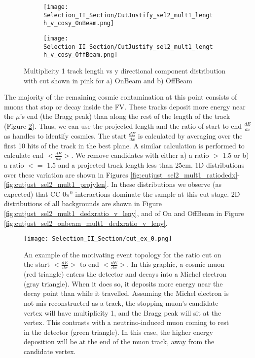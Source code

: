 \begin{figure}[h!]
\centering
  \begin{subfigure}[t]{0.25\textwidth}
    \centering
\texttt{[image: Selection\_II\_Section/CutJustify\_sel2\_mult1\_length\_v\_cosy\_OnBeam.png]}
    \caption{ }
  \end{subfigure} 
  \hspace{20mm}
  \begin{subfigure}[t]{0.25\textwidth}
    \centering
    \texttt{[image: Selection\_II\_Section/CutJustify\_sel2\_mult1\_length\_v\_cosy\_OffBeam.png]}
    \caption{ }
  \end{subfigure} 
\caption{Multiplicity 1 track length vs y directional component distribution with cut shown in pink for a) OnBeam and b) OffBeam }
\label{fig:cutjust_sel2_onbeam_mult1_len_v_cosy}
\end{figure}

\par The majority of the remaining cosmic contamination at this point consists of muons that stop or decay inside the FV.  These tracks deposit more energy near the $\mu$'s end (the Bragg peak) than along the rest of the length of the track (Figure \ref{fig:cut_ex_0}). Thus, we can use the projected length and the ratio of start to end $\frac{dE}{dx}$ as handles to identify cosmics. The start $\frac{dE}{dx}$ is calculated by averaging over the first 10 hits of the track in the best plane. A similar calculation is performed to calculate end $<\frac{dE}{dx}>$. We remove candidates with either a) a ratio $>$ 1.5 or b) a ratio $<=$ 1.5 and a projected track length less than 25cm.  1D distributions over these variation are shown in Figures \ref{fig:cutjust_sel2_mult1_ratiodedx}-\ref{fig:cutjust_sel2_mult1_projylen}.  In these distributions we observe (as expected) that CC-0$\pi^0$ interactions dominate the sample at this cut stage. 2D distributions of all backgrounds are shown in Figure \ref{fig:cutjust_sel2_mult1_dedxratio_v_leny}, and of On and OffBeam in Figure \ref{fig:cutjust_sel2_onbeam_mult1_dedxratio_v_leny}.



\begin{figure}[H]
\centering
\texttt{[image: Selection\_II\_Section/cut\_ex\_0.png]}
\caption{An example of the motivating event topology for the ratio cut on the start $<\frac{dE}{dx}>$ to end $<\frac{dE}{dx}>$. In this graphic, a cosmic muon (red triangle) enters the detector and decays into a Michel electron (gray triangle). When it does so, it deposits more energy near the decay point than while it travelled.  Assuming the Michel electron is not mis-reconstructed as a track, the stopping muon’s candidate vertex will have multiplicity 1, and the Bragg peak will sit at the vertex. This contrasts with a neutrino-induced muon coming to rest in the detector (green triangle).  In this case, the higher energy deposition will be at the end of the muon track, away from the candidate vertex. }
\label{fig:cut_ex_0}
\end{figure}


